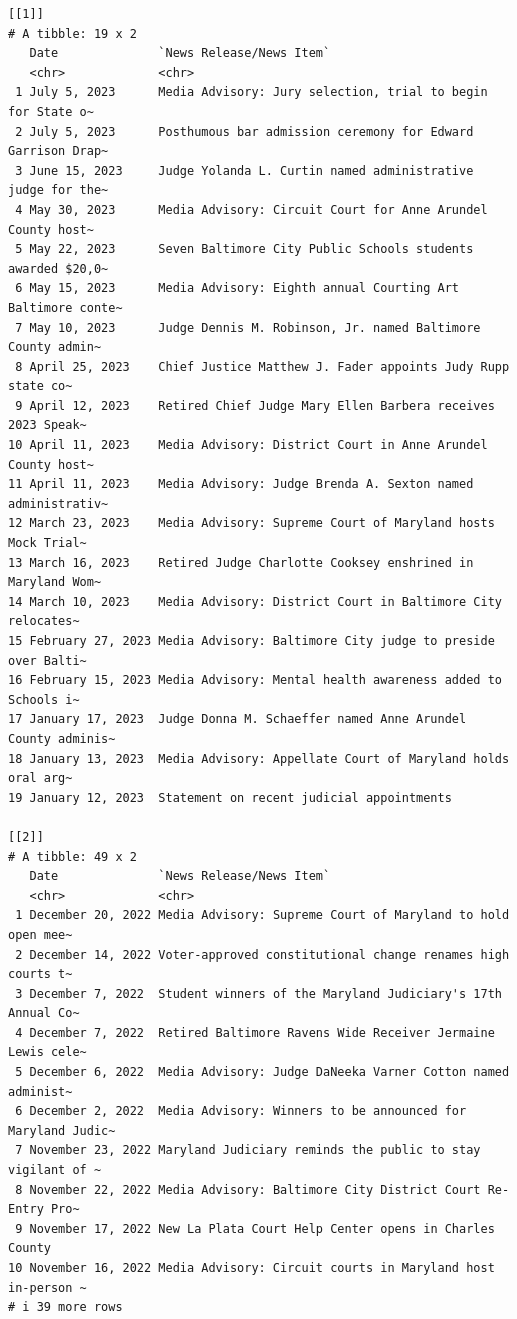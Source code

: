 \documentclass[
  letterpaper,
  DIV=11,
  numbers=noendperiod]{scrreprt}
\begin{document}
\begin{verbatim}
[[1]]
# A tibble: 19 x 2
   Date              `News Release/News Item`                                   
   <chr>             <chr>                                                      
 1 July 5, 2023      Media Advisory: Jury selection, trial to begin for State o~
 2 July 5, 2023      Posthumous bar admission ceremony for Edward Garrison Drap~
 3 June 15, 2023     Judge Yolanda L. Curtin named administrative judge for the~
 4 May 30, 2023      Media Advisory: Circuit Court for Anne Arundel County host~
 5 May 22, 2023      Seven Baltimore City Public Schools students awarded $20,0~
 6 May 15, 2023      Media Advisory: Eighth annual Courting Art Baltimore conte~
 7 May 10, 2023      Judge Dennis M. Robinson, Jr. named Baltimore County admin~
 8 April 25, 2023    Chief Justice Matthew J. Fader appoints Judy Rupp state co~
 9 April 12, 2023    Retired Chief Judge Mary Ellen Barbera receives 2023 Speak~
10 April 11, 2023    Media Advisory: District Court in Anne Arundel County host~
11 April 11, 2023    Media Advisory: Judge Brenda A. Sexton named administrativ~
12 March 23, 2023    Media Advisory: Supreme Court of Maryland hosts Mock Trial~
13 March 16, 2023    Retired Judge Charlotte Cooksey enshrined in  Maryland Wom~
14 March 10, 2023    Media Advisory: District Court in Baltimore City relocates~
15 February 27, 2023 Media Advisory: Baltimore City judge to preside over Balti~
16 February 15, 2023 Media Advisory: Mental health awareness added to Schools i~
17 January 17, 2023  Judge Donna M. Schaeffer named Anne Arundel County adminis~
18 January 13, 2023  Media Advisory: Appellate Court of Maryland holds oral arg~
19 January 12, 2023  Statement on recent judicial appointments                  

[[2]]
# A tibble: 49 x 2
   Date              `News Release/News Item`                                   
   <chr>             <chr>                                                      
 1 December 20, 2022 Media Advisory: Supreme Court of Maryland to hold open mee~
 2 December 14, 2022 Voter-approved constitutional change renames high courts t~
 3 December 7, 2022  Student winners of the Maryland Judiciary's 17th Annual Co~
 4 December 7, 2022  Retired Baltimore Ravens Wide Receiver Jermaine Lewis cele~
 5 December 6, 2022  Media Advisory: Judge DaNeeka Varner Cotton named administ~
 6 December 2, 2022  Media Advisory: Winners to be announced for Maryland Judic~
 7 November 23, 2022 Maryland Judiciary reminds the public to stay vigilant of ~
 8 November 22, 2022 Media Advisory: Baltimore City District Court Re-Entry Pro~
 9 November 17, 2022 New La Plata Court Help Center opens in Charles County     
10 November 16, 2022 Media Advisory: Circuit courts in Maryland host in-person ~
# i 39 more rows


\end{verbatim}
\end{document}
